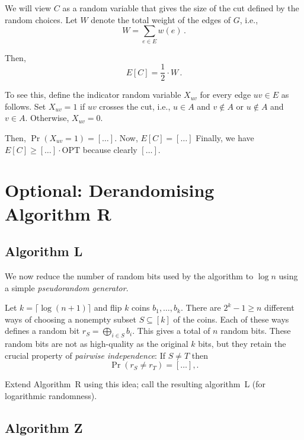 \documentclass{tufte-handout}
\begin{document}
We will view $C$ as a random variable that gives the size of the cut
defined by the random choices.
Let $W$ denote the total weight of the edges of $G$, i.e.,
\[ W= \sum_{e\in E} w(e)\,.\]

Then,
\begin{equation}\label{eq: E[C]}
E[C] = \textstyle\frac{1}{2}\cdot W\,.
\end{equation}

To see this, define the indicator random variable $X_{uv}$ for every
edge $uv\in E$ as follows.
Set $X_{uv}=1$ if $uv$ crosses the cut, i.e., $u\in A$ and $v\notin A$
or $u\notin A$ and $v\in A$.
Otherwise, $X_{uv} = 0$.

Then, $\Pr(X_{uv} = 1) = [\ldots]$.
Now, $E[C]=[\ldots]$ Finally, we have 
\(E[C]\geq [\ldots]\cdot \text{OPT}\) because clearly
$[\ldots]$.


\newpage
\section{Optional: Derandomising Algorithm R}

\subsection{Algorithm L} 


We now reduce the number of random bits used by the algorithm to $\log
n$ using a simple \emph{pseudorandom generator}.


Let $k=\lceil\log (n+1)\rceil$ and flip $k$ coins $b_1,\ldots, b_k$.
There are $2^k -1 \geq n$ different ways of choosing a nonempty subset
$S\subseteq [k]$ of the coins.
Each of these ways defines a random bit $r_S =\bigoplus_{i\in S} b_i$.
This gives a total of $n$ random bits.
These random bits are not as high-quality as the original $k$ bits,
but they retain the crucial property of \emph{pairwise independence}:
If $S\neq T$ then 
\[ \Pr(r_S\neq r_T) = [\ldots],.\]

Extend Algorithm~R using this idea; call the resulting
algorithm~L (for logarithmic randomness).

\subsection{Algorithm Z}
\end{document}
